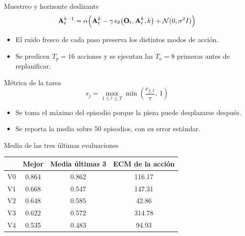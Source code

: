 \documentclass[aspectratio=169,11pt]{beamer}
\begin{document}
\begin{frame}[noframenumbering]{Muestreo y horizonte deslizante}
  \[
    \mathbf{A}^{k-1}_t = \alpha\Big(\mathbf{A}^{k}_t - \gamma\,\epsilon_\theta\big(\mathbf{O}_t,\mathbf{A}^{k}_t,k\big) +
      \mathcal{N}(0,\sigma^2 I)\Big)
  \]
  \begin{itemize}
    \item El ruido fresco de cada paso preserva los distintos modos de acción.
    \item Se predicen $T_p=\num{16}$ acciones y se ejecutan las $T_a=\num{8}$ primeras
          antes de replanificar.
  \end{itemize}
\end{frame}

\begin{frame}[noframenumbering]{Métrica de la tarea}
  \[
    s_j = \max_{1 \le t \le T} \min\!\left(\frac{c_{j,t}}{\tau},\, 1\right)
  \]
  \begin{itemize}
    \item Se toma el máximo del episodio porque la pieza puede desplazarse después.
    \item Se reporta la media sobre \num{50} episodios, con su error estándar.
  \end{itemize}
\end{frame}

\begin{frame}[noframenumbering]{Media de las tres últimas evaluaciones}
  \centering
  \begin{tabular}{l S[table-format=1.3] S[table-format=1.3] S[table-format=3.2]}
    \toprule
    & {Mejor} & {Media últimas 3} & {ECM de la acción} \\
    \midrule
    V0 & 0.864 & 0.862 & 116.17 \\
    V1 & 0.668 & 0.547 & 147.31 \\
    V2 & 0.648 & 0.585 & 42.86 \\
    V3 & 0.622 & 0.572 & 314.78 \\
    V4 & 0.535 & 0.483 & 94.93 \\
    \bottomrule
  \end{tabular}
\end{frame}
\end{document}
